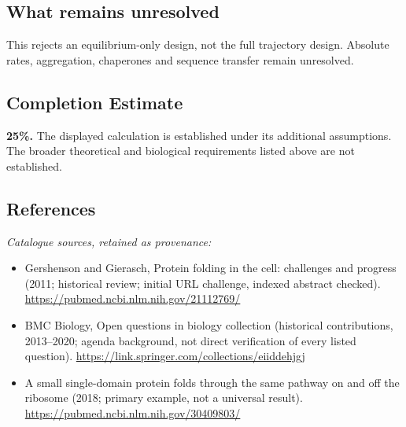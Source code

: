 \documentclass[11pt]{article}
\begin{document}
\subsection{What remains unresolved}
This rejects an equilibrium-only design, not the full trajectory design. Absolute rates, aggregation, chaperones and sequence transfer remain unresolved.
\subsection{Completion Estimate}
\textbf{25\%.} The displayed calculation is established under its additional assumptions. The broader theoretical and biological requirements listed above are not established.
\subsection{References}
\noindent\emph{Catalogue sources, retained as provenance:}
\begin{itemize}
\item Gershenson and Gierasch, Protein folding in the cell: challenges and progress (2011; historical review; initial URL challenge, indexed abstract checked). \url{https://pubmed.ncbi.nlm.nih.gov/21112769/}
\item BMC Biology, Open questions in biology collection (historical contributions, 2013--2020; agenda background, not direct verification of every listed question). \url{https://link.springer.com/collections/eiiddehjgj}
\item A small single-domain protein folds through the same pathway on and off the ribosome (2018; primary example, not a universal result). \url{https://pubmed.ncbi.nlm.nih.gov/30409803/}
\end{itemize}
\end{document}
